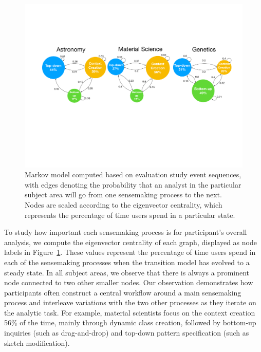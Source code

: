 \begin{figure}[h!]
  \includegraphics[width=\linewidth]{figures/transition.pdf}
  \caption{Markov model computed based on evaluation study event sequences, with edges denoting the probability that an analyst in the particular subject area will go from one sensemaking process to the next. Nodes are scaled according to the eigenvector centrality, which represents the percentage of time users spend in a particular state.}\label{fig:transition}
\end{figure}
\par To study how important each sensemaking process is for participant's overall analysis, we compute the eigenvector centrality of each graph, displayed as node labels in Figure~\ref{fig:transition}. These values represent the percentage of time users spend in each of the sensemaking processes when the transition model has evolved to a steady state. In all subject areas, we observe that there is always a prominent node connected to two other smaller nodes. Our observation demonstrates how participants often construct a central workflow around a main sensemaking process and interleave variations with the two other processes as they iterate on the analytic task. For example, material scientists focus on the context creation 56\% of the time, mainly through dynamic class creation, followed by bottom-up inquiries (such as drag-and-drop) and top-down pattern specification (such as sketch modification). 
